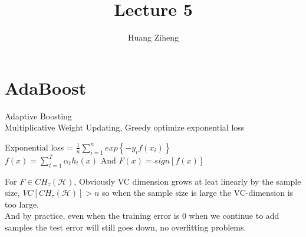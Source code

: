 \documentclass{article}
\author{Huang Ziheng}
\title{Lecture 5}
\begin{document}
\maketitle

\section{AdaBoost}
Adaptive Boosting
\\Multiplicative Weight Updating, Greedy optimize exponential loss
\begin{center}
Exponential loss = $\frac{1}{n}\sum_{i=1}^{n}exp\left\{-y_if(x_i)\right\}$
\\$f(x)=\sum_{t=1}^T\alpha_th_t(x)$ And $F(x)=sign[f(x)]$
\end{center}
For $F\in CH_\tau(\mathcal{H})$, Obviously VC dimension grows at leat linearly by the sample size, $VC[CH_\tau(\mathcal{H})]>n$ so when the sample size is large the VC-dimension is too large.
\\And by practice, even when the training error is 0 when we continue to add samples the test error will still goes down, no overfitting problems.
\end{document}
